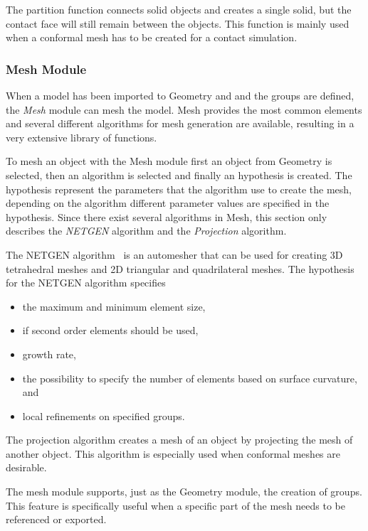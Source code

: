 The partition function connects solid objects and creates a single solid, but the contact face will still remain between the objects. This function is mainly used when a conformal mesh has to be created for a contact simulation.~\cite{salomedoc}

\subsubsection{Mesh Module} %
\label{ssub:mesh_module}
When a model has been imported to Geometry and and the groups are defined, the \textit{Mesh} module can mesh the model. Mesh provides the most common elements and several different algorithms for mesh generation are available, resulting in a very extensive library of functions.

To mesh an object with the Mesh module first an object from Geometry is selected, then an algorithm is selected and finally an hypothesis is created. The hypothesis represent the parameters that the algorithm use to create the mesh, depending on the algorithm different parameter values are specified in the hypothesis. Since there exist several algorithms in Mesh, this section only describes the \textit{NETGEN} algorithm and the \textit{Projection} algorithm.

The NETGEN algorithm~\cite{netgen} is an automesher that can be used for creating 3D tetrahedral meshes and 2D triangular and quadrilateral meshes. The hypothesis for the NETGEN algorithm specifies
\begin{itemize}
	\item the maximum and minimum element size, 
	\item if second order elements should be used,
	\item growth rate,
	\item the possibility to specify the number of elements based on surface curvature, and
	\item local refinements on specified groups. 
\end{itemize}

The projection algorithm creates a mesh of an object by projecting the mesh of another object. This algorithm is especially used when conformal meshes are desirable.

The mesh module supports, just as the Geometry module, the creation of groups. This feature is specifically useful when a specific part of the mesh needs to be referenced or exported.

